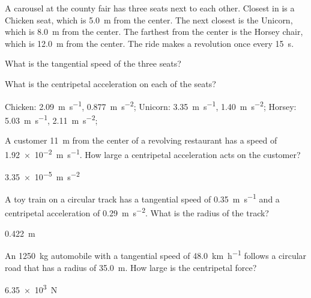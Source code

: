 \begin{question}[ID=centripetal-C-Q01,topic=circular-motion,difficulty=C]
    A carousel at the county fair has three seats next to each other.
    Closest in is a Chicken seat,
        which is \SI{5.0}{\meter} from the center.
    The next closest is the Unicorn,
        which is \SI{8.0}{\meter} from the center.
    The farthest from the center is the Horsey chair,
        which is \SI{12.0}{\meter} from the center.
    The ride makes a revolution once every \SI{15}{\second}.
    \begin{enumerate*}[label=\arabic*)]
        \item What is the tangential speed of the three seats?
        \item What is the centripetal acceleration on each of the seats?
    \end{enumerate*}
\end{question}
\begin{solution}
    Chicken: \SI{2.09}{\meter\per\second}, \SI{0.877}{\meter\per\second\squared};
    Unicorn: \SI{3.35}{\meter\per\second}, \SI{1.40}{\meter\per\second\squared};
    Horsey: \SI{5.03}{\meter\per\second}, \SI{2.11}{\meter\per\second\squared};
\end{solution}


\begin{question}[ID=centripetal-C-Q02,topic=circular-motion,difficulty=C]
    A customer \SI{11}{\meter} from the center of a revolving
        restaurant has a speed of \SI{1.92e-2}{\meter\per\second}.
    How large a centripetal acceleration acts on the customer?
\end{question}
\begin{solution}
    \SI{3.35e-5}{\meter\per\second\squared}
\end{solution}


\begin{question}[ID=centripetal-C-Q03,topic=circular-motion,difficulty=C]
    A toy train on a circular track has a tangential speed of
        \SI{0.35}{\meter\per\second} and a centripetal acceleration
        of \SI{0.29}{\meter\per\second\squared}.
    What is the radius of the track?
\end{question}
\begin{solution}
    \SI{0.422}{\meter}
\end{solution}


\begin{question}[ID=centripetal-C-Q04,topic=circular-motion,difficulty=C]
    An \SI{1250}{\kilo\gram} automobile with a tangential speed
        of \SI{48.0}{\kilo\meter\per\hour} follows a circular
        road that has a radius of \SI{35.0}{\meter}.
    How large is the centripetal force?
\end{question}
\begin{solution}
    \SI{6.35e3}{\newton}
\end{solution}


\endinput

